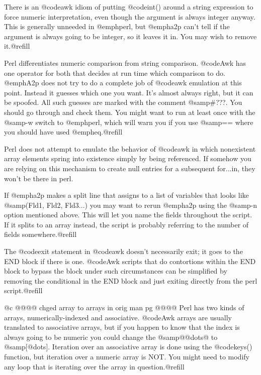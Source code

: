 {{{{{{{{{{{{{There is an @code{awk} idiom of putting @code{int()} around a string
expression to force numeric interpretation, even though the argument is
always integer anyway.  This is generally unneeded in @emph{perl}, but
@emph{a2p} can't tell if the argument is always going to be integer, so
it leaves it in.  You may wish to remove it.@refill

Perl differentiates numeric comparison from string comparison.
@code{Awk} has one operator for both that decides at run time which
comparison to do.  @emph{A2p} does not try to do a complete job of
@code{awk} emulation at this point.  Instead it guesses which one you
want.  It's almost always right, but it can be spoofed.  All such
guesses are marked with the comment @samp{#???}.  You should go through
and check them.  You might want to run at least once with the @samp{-w}
switch to @emph{perl}, which will warn you if you use @samp{==} where
you should have used @emph{eq}.@refill

Perl does not attempt to emulate the behavior of @code{awk} in which
nonexistent array elements spring into existence simply by being
referenced.  If somehow you are relying on this mechanism to create null
entries for a subsequent for...in, they won't be there in perl.

If @emph{a2p} makes a split line that assigns to a list of variables
that looks like @samp{(Fld1, Fld2, Fld3...)} you may want to rerun
@emph{a2p} using the @samp{-n} option mentioned above.  This will let
you name the fields throughout the script.  If it splits to an array
instead, the script is probably referring to the number of fields
somewhere.@refill

The @code{exit} statement in @code{awk} doesn't necessarily exit; it
goes to the END block if there is one.  @code{Awk} scripts that do
contortions within the END block to bypass the block under such
circumstances can be simplified by removing the conditional in the END
block and just exiting directly from the perl script.@refill

@c @@@@ chged array to arrays in orig man pg @@@@
Perl has two kinds of arrays, numerically-indexed and associative.
@code{Awk} arrays are usually translated to associative arrays, but if
you happen to know that the index is always going to be numeric you
could change the @samp{@{@dots{}@}} to @samp{[@dots{}]}.  Iteration over
an associative array is done using the @code{keys()} function, but
iteration over a numeric array is NOT.  You might need to modify any
loop that is iterating over the array in question.@refill

}}}}}}}}}}}}}
